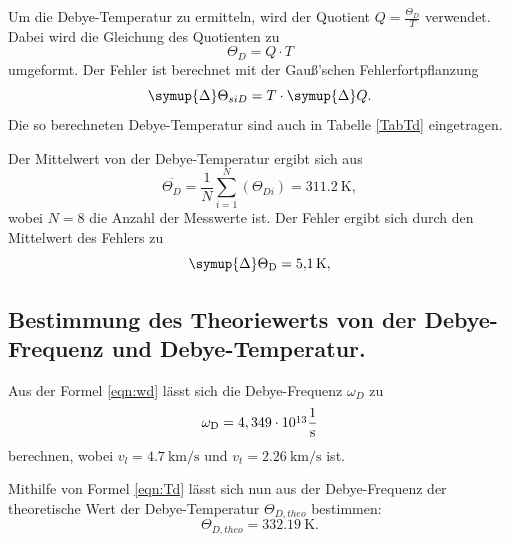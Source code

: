 Um die Debye-Temperatur zu ermitteln, wird der Quotient $Q = \frac{\Theta_{\si{D}}}{T}$ verwendet. Dabei 
wird die Gleichung des Quotienten zu 
\begin{equation*}
    \Theta_{\si{D}} = Q \cdot T
\end{equation*} 
umgeformt. 
Der Fehler ist berechnet mit der Gauß'schen Fehlerfortpflanzung 
\begin{equation}
    \symup{\Delta}\Theta_{si{D}} = T \cdot \symup{\Delta}Q.
\end{equation}
Die so berechneten Debye-Temperatur sind auch in Tabelle \ref{TabTd} eingetragen.

Der Mittelwert von der Debye-Temperatur ergibt sich aus
\begin{equation*}
  \overline{\Theta_{\si{D}}}=  \frac{1}{N} \sum_{i=1}^N (\Theta_{\si{D}i}) = \SI{311,2}{\kelvin},
\end{equation*}
wobei $N=8$ die Anzahl der Messwerte ist. Der Fehler ergibt sich durch den Mittelwert des Fehlers zu 
\begin{equation*}
  \symup{\Delta} \Theta_{\si{D}} = \SI{5,1}{\kelvin},
\end{equation*}




\subsection{Bestimmung des Theoriewerts von der Debye-Frequenz und Debye-Temperatur.}

Aus der Formel \ref{eqn:wd} lässt sich die Debye-Frequenz $\omega_{\si{D}}$ zu
\begin{equation*}
    \omega_{\si{D}} = 4,349 \cdot \cramped{10^{13}} \frac{1}{\si{s}}
\end{equation*}
berechnen, wobei $v_{\si{l}}=\SI{4,7}{\kilo\metre\per\second}$ und 
$v_{\si{t}}=\SI{2,26}{\kilo\metre\per\second}$ ist.

Mithilfe von Formel \ref{eqn:Td} lässt sich nun aus der Debye-Frequenz der theoretische Wert der 
Debye-Temperatur $\Theta_{\si{D,theo}}$ bestimmen:
\begin{equation*}
    \Theta_{\si{D,theo}} = \SI{332,19}{\kelvin}.
\end{equation*}
 
